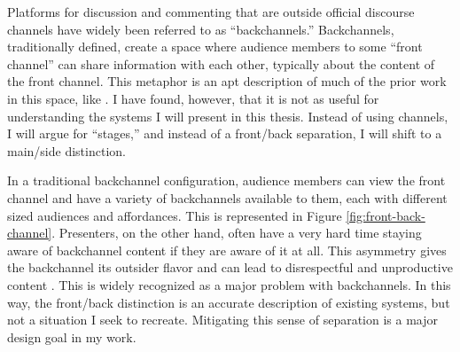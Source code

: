 Platforms for discussion and commenting that are outside official discourse channels have widely been referred to as ``backchannels.''  Backchannels, traditionally defined, create a space where audience members to some ``front channel'' can share information with each other, typically about the content of the front channel.  This metaphor is an apt description of much of the prior work in this space, like \citep{Cogdill:2001fp,Yardi:2006uk,mccarthy_digital_2004,Rekimoto:1998jy}. I have found, however, that it is not as useful for understanding the systems I will present in this thesis. Instead of using channels, I will argue for ``stages,'' and instead of a front/back separation, I will shift to a main/side distinction. 


In a traditional backchannel configuration, audience members can view the front channel and have a variety of backchannels available to them, each with different sized audiences and affordances. This is represented in Figure \ref{fig:front-back-channel}. Presenters, on the other hand, often have a very hard time staying aware of backchannel content if they are aware of it at all. This asymmetry gives the backchannel its outsider flavor and can lead to disrespectful and unproductive content \citep{boyd:Yo36SNyj}. This is widely recognized as a major problem with backchannels. In this way, the front/back distinction is an accurate description of existing systems, but not a situation I seek to recreate.  Mitigating this sense of separation is a major design goal in my work.






